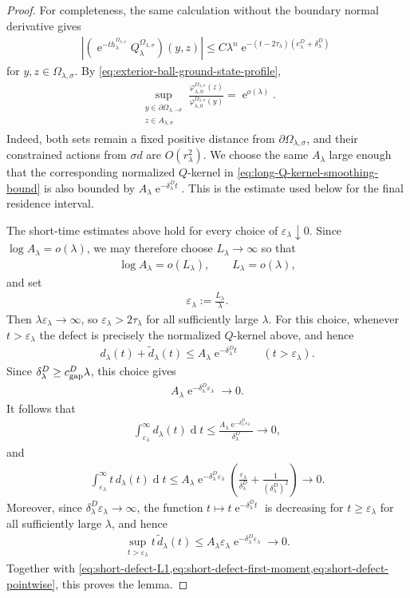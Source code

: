 \documentclass[a4paper,10pt]{article}
\numberwithin{equation}{section}
\theoremstyle{plain}
\theoremstyle{plain}
\theoremstyle{plain}
\theoremstyle{plain}
\theoremstyle{plain}
\theoremstyle{remark}
\theoremstyle{definition}
\newcommand{\ee}{\operatorname{e}}
\newcommand{\dif}{\operatorname{d}\!} %
\newcommand{\vf}{\varphi}
\newcommand{\abs}[1]{\left\lvert#1\right\rvert}
\newcommand{\eq}[1]{\begin{align*}#1\end{align*}}
\newcommand{\eql}[1]{\begin{align}#1\end{align}}
\newcommand{\br}[1]{\left(#1\right)}
\begin{document}
\begin{proof}
For completeness, the same calculation without the boundary normal
derivative gives
\eql{
\abs{
\left(
\ee^{-t h_\lambda^{\Omega_{\lambda,\sigma}}}
Q_\lambda^{\Omega_{\lambda,\sigma}}
\right)(y,z)
}
\leq
C\lambda^n
\ee^{-(t-2\tau_\lambda)
\br{e_\lambda^D+\delta_\lambda^D}}
\label{eq:long-Q-kernel-smoothing-bound}
}
for $y,z\in\Omega_{\lambda,\sigma}$. By
\cref{eq:exterior-ball-ground-state-profile},
\eq{
\sup_{\substack{
y\in\partial\Omega_{\lambda,-\sigma}\\
z\in A_{\lambda,\sigma}
}}
\frac{
\vf_{\lambda,0}^{\Omega_{\lambda,\sigma}}(z)
}{
\vf_{\lambda,0}^{\Omega_{\lambda,\sigma}}(y)
}
=
\ee^{o(\lambda)}.
}
Indeed, both sets remain a fixed positive distance from
$\partial\Omega_{\lambda,\sigma}$, and their constrained actions from
$\sigma d$ are $O(r_\lambda^2)$.
We choose the same $A_\lambda$ large enough that the corresponding
normalized $Q$-kernel in
\cref{eq:long-Q-kernel-smoothing-bound} is also bounded by
$A_\lambda\ee^{-\delta_\lambda^Dt}$. This is the estimate used below
for the final residence interval.

The short-time estimates above hold for every choice of $\varepsilon_\lambda\downarrow0$. Since $\log A_\lambda=o(\lambda)$, we may therefore choose $L_\lambda\to\infty$ so that
\eq{
\log A_\lambda=o(L_\lambda),
\qquad
L_\lambda=o(\lambda),
}
and set
\eq{
\varepsilon_\lambda:=\frac{L_\lambda}{\lambda}.
}
Then $\lambda\varepsilon_\lambda\to\infty$, so $\varepsilon_\lambda>2\tau_\lambda$ for all sufficiently large $\lambda$. For this choice, whenever $t>\varepsilon_\lambda$ the defect is precisely the normalized $Q$-kernel above, and hence
\eql{
d_\lambda(t)+\widetilde d_\lambda(t)
\leq
A_\lambda\ee^{-\delta_\lambda^D t}
\qquad
(t>\varepsilon_\lambda).
\label{eq:long-defect-exponential}
}
Since $\delta_\lambda^D\geq c_{\rm gap}^D\lambda$, this choice gives
\eql{
A_\lambda\ee^{-\delta_\lambda^D\varepsilon_\lambda}
\longrightarrow0.
\label{eq:choice-epsilon-kills-Q}
}
It follows that
\eq{
\int_{\varepsilon_\lambda}^\infty d_\lambda(t)\dif{t}
\leq
\frac{A_\lambda\ee^{-\delta_\lambda^D\varepsilon_\lambda}}{\delta_\lambda^D}
\longrightarrow0,
}
and
\eq{
\int_{\varepsilon_\lambda}^\infty t\,d_\lambda(t)\dif{t}
\leq
A_\lambda\ee^{-\delta_\lambda^D\varepsilon_\lambda}
\left(
\frac{\varepsilon_\lambda}{\delta_\lambda^D}
+
\frac{1}{(\delta_\lambda^D)^2}
\right)
\longrightarrow0.
}
Moreover, since $\delta_\lambda^D\varepsilon_\lambda\to\infty$, the function $t\mapsto t\ee^{-\delta_\lambda^Dt}$ is decreasing for $t\geq\varepsilon_\lambda$ for all sufficiently large $\lambda$, and hence
\eql{
\sup_{t>\varepsilon_\lambda}t\,\widetilde d_\lambda(t)
\leq
A_\lambda\varepsilon_\lambda
\ee^{-\delta_\lambda^D\varepsilon_\lambda}
\longrightarrow0.
\label{eq:long-defect-pointwise}
}
Together with \cref{eq:short-defect-L1,eq:short-defect-first-moment,eq:short-defect-pointwise}, this proves the lemma.
\end{proof}
\end{document}

